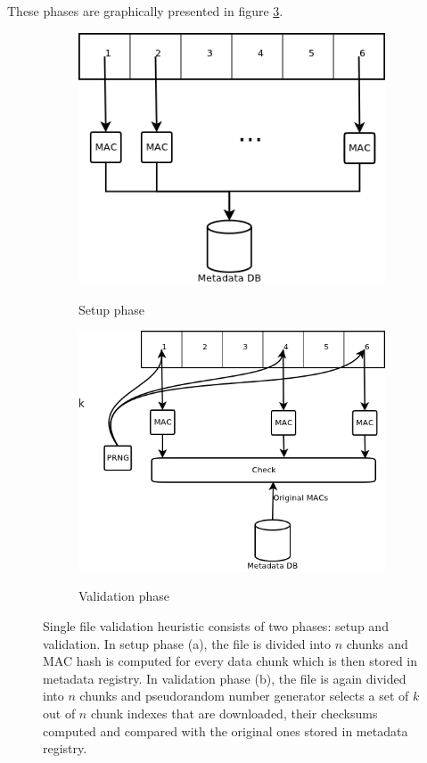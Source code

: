 These phases are graphically presented in figure \ref{fig:algorithm-scheme}.\\

\begin{figure}
	\begin{subfigure}[h!]{0.45\textwidth}
		\centering
		\includegraphics[width=\textwidth]{images/algorithm-setup.png}
		\label{fig:setup}
		\caption{Setup phase}
	\end{subfigure}
	\begin{subfigure}[h!]{0.45\textwidth}
		\centering
		\includegraphics[width=\textwidth]{images/algorithm-validation.png}
		\label{fig:validation}
		\caption{Validation phase}
	\end{subfigure}
	\caption{Single file validation heuristic consists of two phases: setup
	and validation. In setup phase (a), the file is divided into $n$ chunks and
	MAC hash is computed for every data chunk which is then stored in metadata
	registry. In validation phase (b), the file is again divided into $n$
	chunks and pseudorandom number generator selects a set of $k$ out of $n$
	chunk indexes that are downloaded, their checksums computed and compared
	with the original ones stored in metadata registry.}
	\label{fig:algorithm-scheme}
\end{figure}

